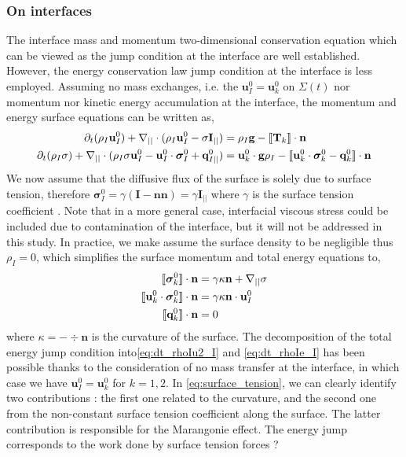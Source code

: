 \subsubsection{On interfaces}

The interface mass and momentum two-dimensional conservation equation which can be viewed as the jump condition at the interface are well established.
However, the energy conservation law jump condition at the interface is less employed.
Assuming no mass exchanges, i.e. the  $\textbf{u}_I^0 = \textbf{u}_k^0$ on $\Sigma(t)$ nor momentum  nor kinetic energy accumulation at the interface, the momentum and energy surface equations can be written as, 
\begin{align}
    \label{eq:dt_rhoIu_I}
    \partial_t (\rho_I\textbf{u}_I^0)  
    + \mathbf{\nabla}_{||}\cdot (
    \rho_I\textbf{u}_I^0
    -\sigma \textbf{I}_{||} )
    &= 
    \rho_I \textbf{g}
    - \llbracket 
        \mathbf{T}_k
     \rrbracket \cdot \textbf{n}\\
    \label{eq:dt_rhoIE_I}
    \partial_t (\rho_I\sigma)  
    + \mathbf{\nabla}_{||}\cdot (
        \rho_I\sigma\textbf{u}_I^0
        - \textbf{u}_I^0 \cdot \bm{\sigma}_I^0 
        + \textbf{q}_{I||}^0
        )
    &= 
    \textbf{u}_k^0 \cdot \textbf{g}  \rho_I
    - \llbracket \textbf{u}_k^0 \cdot \bm{\sigma}_k^0 - \textbf{q}_k^0 \rrbracket \cdot \textbf{n}
\end{align} 
We now assume that the diffusive flux of the surface is solely due to surface tension, therefore $\bm{\sigma}_I^0  = \gamma (\textbf{I} - \textbf{nn}) = \gamma \textbf{I}_{||}$ where $\gamma$ is the surface tension coefficient \citep[Chapter 2]{tryggvason2011direct}.  
Note that in a more general case, interfacial viscous stress could be included \citep{brenner2013interfacial,slattery2007interfacial} due to contamination of the interface, but it will not be addressed in this study. 
In practice, we make assume the surface density to be negligible thus $\rho_I = 0$, which simplifies the surface momentum and total energy equations to,
\begin{align}
    \llbracket \bm{\sigma}_k^0 \rrbracket \cdot \textbf{n} 
    &=
    \gamma\kappa\textbf{n}
    + \mathbf{\nabla}_{||}\sigma 
    \label{eq:surface_tension}\\
    \label{eq:dt_rhoIu2_I}
    \llbracket \textbf{u}_k^0 \cdot \bm{\sigma}_k^0 \rrbracket \cdot \textbf{n}
    &= 
     \gamma\kappa\textbf{n}\cdot \textbf{u}_{I}^0\\
    \label{eq:dt_rhoIe_I}
    \llbracket  \textbf{q}_k^0 \rrbracket \cdot \textbf{n}
    &= 
     0
\end{align}
where $\kappa = - \div\textbf{n}$ is the curvature of the surface.
The decomposition of the total energy jump condition into\ref{eq:dt_rhoIu2_I} and \ref{eq:dt_rhoIe_I} has been possible thanks to the consideration of no mass transfer at the interface, in which case we have $\textbf{u}_I^0=\textbf{u}_k^0$ for $k =1,2$. 
In \ref{eq:surface_tension}, we can clearly identify two contributions : the first one related to the curvature, and the second one from the non-constant surface tension coefficient along the surface. 
The latter contribution is responsible for the Marangonie effect.
The energy jump corresponds to the work done by surface tension forces ? 


